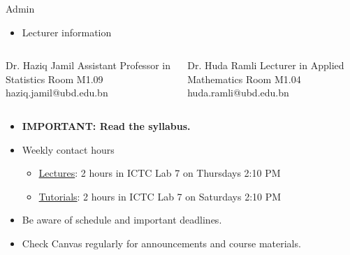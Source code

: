 \documentclass[,aspectratio=169]{beamer}
\newenvironment{Shaded}{\begin{snugshade}}{\end{snugshade}}
\newcommand{\NormalTok}[1]{#1}
\providecommand{\tightlist}{%
  \setlength{\itemsep}{0pt}\setlength{\parskip}{0pt}}
\begin{document}
\begin{frame}[fragile]{Admin}
\protect\hypertarget{admin-1}{}
\begin{itemize}
\tightlist
\item
  Lecturer information
\end{itemize}

\vspace{-1.5em}

\begin{columns}[T]
\begin{column}{0.45\textwidth}
\footnotesize

\begin{Shaded}
\begin{Highlighting}[]
\NormalTok{Dr. Haziq Jamil}
\NormalTok{Assistant Professor in Statistics}
\NormalTok{Room M1.09}
\NormalTok{haziq.jamil@ubd.edu.bn}
\end{Highlighting}
\end{Shaded}
\end{column}

\begin{column}{0.45\textwidth}
\footnotesize

\begin{Shaded}
\begin{Highlighting}[]
\NormalTok{Dr. Huda Ramli}
\NormalTok{Lecturer in Applied Mathematics}
\NormalTok{Room M1.04}
\NormalTok{huda.ramli@ubd.edu.bn}
\end{Highlighting}
\end{Shaded}
\end{column}
\end{columns}

\vspace{0.5em}

\begin{itemize}
\item
  \textcolor{solidpink}{\textbf{IMPORTANT: Read the syllabus.}}
\item
  Weekly contact hours

  \begin{itemize}
  \tightlist
  \item
    \underline{Lectures}: 2 hours in ICTC Lab 7 on Thursdays 2:10 PM
  \item
    \underline{Tutorials}: 2 hours in ICTC Lab 7 on Saturdays 2:10 PM
  \end{itemize}
\item
  Be aware of schedule and important deadlines.
\item
  Check Canvas regularly for announcements and course materials.
\end{itemize}
\end{frame}
\end{document}
